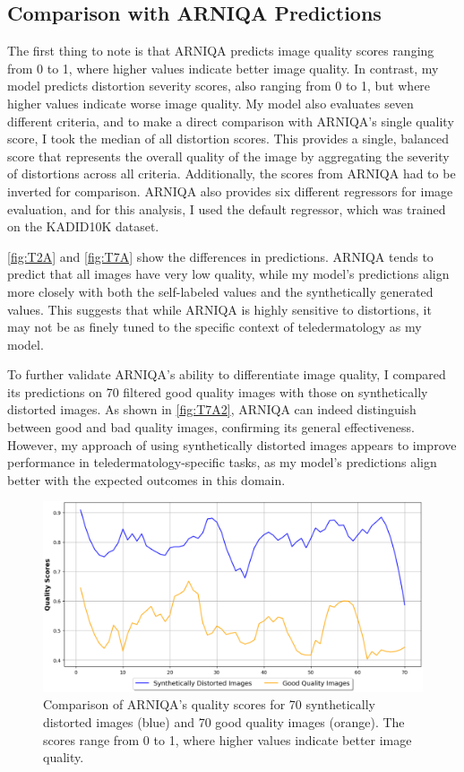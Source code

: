 \subsection{Comparison with ARNIQA Predictions}
\label{subsec:ComparisonARNIQA}
The first thing to note is that ARNIQA predicts image quality scores ranging from 0 to 1, where higher values indicate better image quality. In contrast, my model predicts distortion severity scores, also ranging from 0 to 1, but where higher values indicate worse image quality. My model also evaluates seven different criteria, and to make a direct comparison with ARNIQA’s single quality score, I took the median of all distortion scores. This provides a single, balanced score that represents the overall quality of the image by aggregating the severity of distortions across all criteria. Additionally, the scores from ARNIQA had to be inverted for comparison. ARNIQA also provides six different regressors for image evaluation, and for this analysis, I used the default regressor, which was trained on the KADID10K dataset. \par
\vspace{\baselineskip}
\noindent
\autoref{fig:T2A} and \autoref{fig:T7A} show the differences in predictions. ARNIQA tends to predict that all images have very low quality, while my model’s predictions align more closely with both the self-labeled values and the synthetically generated values. This suggests that while ARNIQA is highly sensitive to distortions, it may not be as finely tuned to the specific context of teledermatology as my model. \par
\vspace{\baselineskip}
\noindent
To further validate ARNIQA’s ability to differentiate image quality, I compared its predictions on 70 filtered good quality images with those on synthetically distorted images. As shown in \autoref{fig:T7A2}, ARNIQA can indeed distinguish between good and bad quality images, confirming its general effectiveness. However, my approach of using synthetically distorted images appears to improve performance in teledermatology-specific tasks, as my model’s predictions align better with the expected outcomes in this domain. \par
\begin{figure}[ht]
    \centering
    \includegraphics[keepaspectratio,width=15cm]{img/hept/test_70_arniqa2.png}
    \caption{Comparison of ARNIQA’s quality scores for 70 synthetically distorted images (blue) and 70 good quality images (orange). The scores range from 0 to 1, where higher values indicate better image quality.}
    \label{fig:T7A2}
\end{figure}
